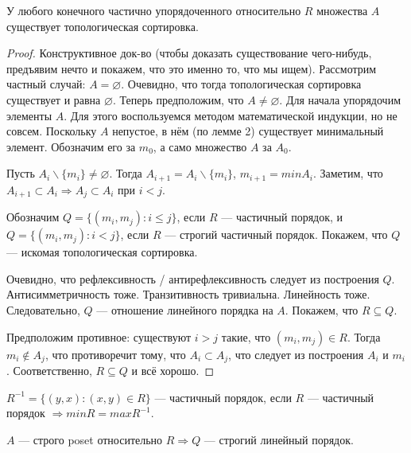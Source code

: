 \begin{theorem}
    У любого конечного частично упорядоченного относительно $R$ множества $A$ существует топологическая сортировка.
\end{theorem}

\begin{proof}
    Конструктивное док-во (чтобы доказать существование чего-нибудь, предъявим нечто и покажем, что это именно то, что мы ищем). Рассмотрим частный случай: $A = \varnothing$. Очевидно, что тогда топологическая сортировка существует и равна $\varnothing$. Теперь предположим, что $A \neq \varnothing$. Для начала упорядочим элементы $A$. Для этого воспользуемся методом математической индукции, но не совсем. Поскольку $A$ непустое, в нём (по лемме 2) существует минимальный элемент. Обозначим его за $m_0$, а само множество $A$ за $A_0$.

    Пусть $A_i \backslash \{m_i\} \neq \varnothing$. Тогда $A_{i + 1} = A_i \backslash \{m_i\}$, $m_{i+1} = min A_i$. Заметим, что $A_{i+1} \subset A_i \Rightarrow A_j \subset A_i$ при $i < j$.

    Обозначим $Q = \{(m_i, m_j) : i \leq j\}$, если $R$ --- частичный порядок, и $Q = \{(m_i, m_j) : i < j\}$, если $R$ --- строгий частичный порядок. Покажем, что $Q$ --- искомая топологическая сортировка.

    Очевидно, что рефлексивность / антирефлексивность следует из построения $Q$. Антисимметричность тоже. Транзитивность тривиальна. Линейность тоже. Следовательно, $Q$ --- отношение линейного порядка на $A$. Покажем, что $R \subseteq Q$.

    Предположим противное: существуют $i > j$ такие, что $(m_i, m_j) \in R$. Тогда $m_i \notin A_j$, что противоречит тому, что $A_i \subset A_j$, что следует из построения $A_i$ и $m_i$. Соответственно, $R \subseteq Q$ и всё хорошо.
\end{proof}

\begin{sh-remark}
    $R^{-1} = \{(y, x) : (x, y) \in R\}$ --- частичный порядок, если $R$ --- частичный порядок $\Rightarrow min R = max R^{-1}$.
\end{sh-remark}

\begin{sh-remark}
    $A$ --- строго poset относительно $R \Rightarrow Q$ --- строгий линейный порядок.
\end{sh-remark}